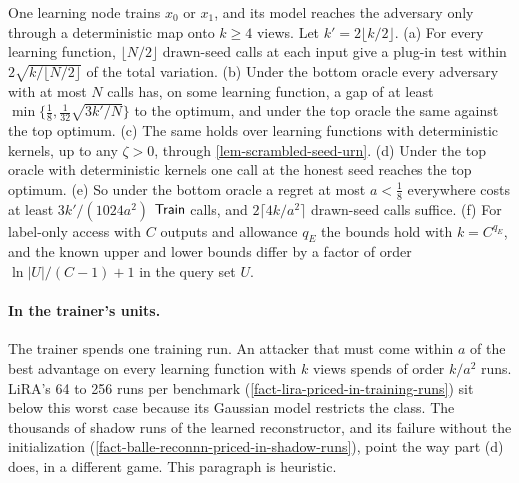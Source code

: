 \begin{theorem}
One learning node trains $x_0$ or $x_1$, and its model reaches the adversary only
through a deterministic map onto $k\ge4$ views. Let $k'=2\lfloor k/2\rfloor$. (a) For
every learning function, $\lfloor N/2\rfloor$ drawn-seed calls at each input give a
plug-in test within $2\sqrt{k/\lfloor N/2\rfloor}$ of the total variation. (b) Under
the bottom oracle every adversary with at most $N$ calls has, on some learning
function, a gap of at least $\min\{\frac18,\frac1{32}\sqrt{3k'/N}\}$ to the optimum,
and under the top oracle the same against the top optimum. (c) The same holds over
learning functions with deterministic kernels, up to any $\zeta>0$, through
\cref{lem-scrambled-seed-urn}. (d) Under the top oracle with deterministic kernels one
call at the honest seed reaches the top optimum. (e) So under the bottom oracle a
regret at most $a<\frac18$ everywhere costs at least $3k'/(1024a^2)$ $\mathsf{Train}$ calls, and
$2\lceil4k/a^2\rceil$ drawn-seed calls suffice. (f) For label-only access with $C$
outputs and allowance $q_E$ the bounds hold with $k=C^{q_E}$, and the known upper and
lower bounds differ by a factor of order $\ln|U|/(C-1)+1$ in the query set $U$.
\end{theorem}

\paragraph{In the trainer's units.} The trainer spends one training run. An attacker
that must come within $a$ of the best advantage on every learning function with $k$
views spends of order $k/a^2$ runs. LiRA's 64 to 256 runs per benchmark
(\cref{fact-lira-priced-in-training-runs}) sit below this worst case because its
Gaussian model restricts the class. The thousands of shadow runs of the learned
reconstructor, and its failure without the initialization
(\cref{fact-balle-reconnn-priced-in-shadow-runs}), point the way part (d) does, in a
different game. This paragraph is heuristic.

